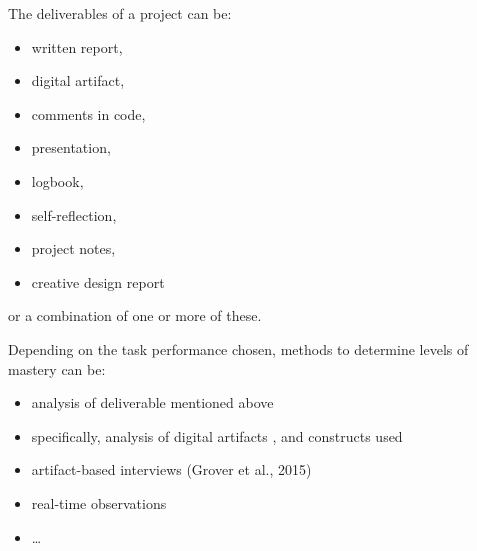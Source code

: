 The deliverables of a project can be:
\begin{itemize}
\item written report,
\item digital artifact,
\item comments in code,
\item presentation,
\item logbook,
\item self-reflection,
\item project notes,
\item creative design report
\end{itemize}
or a combination of one or more of these.


Depending on the task performance chosen, methods to determine levels of mastery can be:
\begin{itemize}
\item analysis of deliverable mentioned above 

\item specifically, analysis of digital artifacts  \cite{BrennanResnick2012} , and constructs used 

\item artifact-based interviews (Grover et al., 2015)
\item real-time observations
\item \ldots
\end{itemize}



